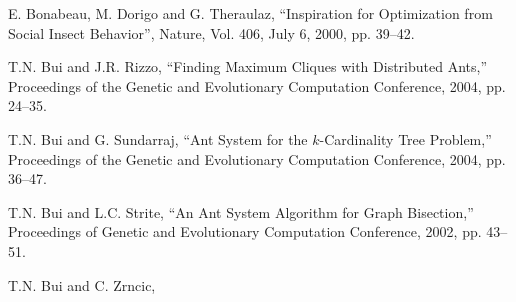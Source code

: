 \documentclass[11pt]{article}
\begin{document}
\begin{thebibliography}{99} 





E. Bonabeau, M. Dorigo and G. Theraulaz,
``Inspiration for Optimization from Social Insect Behavior'',
Nature, Vol. 406, July 6, 2000, pp. 39--42.





T.N. Bui and J.R. Rizzo, ``Finding Maximum Cliques with Distributed Ants,'' Proceedings of the Genetic and Evolutionary Computation Conference, 2004, pp. 24--35.

T.N. Bui  and G. Sundarraj,  ``Ant System for the $k$-Cardinality Tree Problem,'' Proceedings of the Genetic and Evolutionary Computation Conference, 2004, pp. 36--47.


T.N. Bui and L.C. Strite, ``An Ant System Algorithm for Graph Bisection,'' Proceedings of  Genetic and Evolutionary Computation Conference, 2002, pp. 43--51.

T.N. Bui and C. Zrncic, 







\end{thebibliography}
\end{document}
